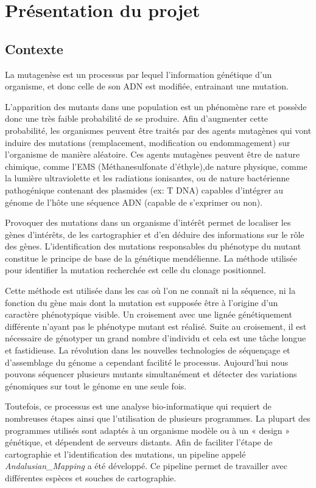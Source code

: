 \documentclass[12pt]{article}
\begin{document}
\newpage

\section{Présentation du projet}
\subsection{Contexte}

La mutagenèse est un processus par lequel l'information génétique d'un organisme, et donc celle de son ADN est modifiée, entrainant une mutation.

L'apparition des mutants dans une population est un phénomène rare et possède donc une très faible probabilité de se produire. Afin d'augmenter cette probabilité, les organismes peuvent être traités par des agents mutagènes qui vont induire des mutations (remplacement, modification ou endommagement) sur l'organisme de manière aléatoire. Ces agents mutagènes peuvent être de nature chimique, comme l'EMS (Méthanesulfonate d'éthyle),de nature physique, comme la lumière ultraviolette et les radiations ionisantes, ou de nature bactérienne pathogénique contenant des plasmides (ex: T DNA) capables d’intégrer au génome de l'hôte une séquence ADN (capable de s'exprimer ou non). 

Provoquer des mutations dans un organisme d’intérêt permet de localiser les gènes d’intérêts, de les cartographier et d'en déduire des informations sur le rôle des gènes. L'identification des mutations responsables du phénotype du mutant constitue le principe de base de la génétique mendélienne. La méthode utilisée pour identifier la mutation recherchée est celle du clonage positionnel.

Cette méthode est utilisée dans les cas où l'on ne connaît ni la séquence, ni la fonction du gène mais dont la mutation est supposée être à l'origine d'un caractère phénotypique visible. Un croisement avec une lignée génétiquement différente n'ayant pas le phénotype mutant est réalisé. Suite au croisement, il est nécessaire de génotyper un grand nombre d'individu et cela est une tâche longue et fastidieuse. La révolution dans les nouvelles technologies de séquençage et d'assemblage du génome a cependant facilité le processus. Aujourd'hui nous pouvons séquencer plusieurs mutants simultanément et détecter des variations génomiques sur tout le génome en une seule fois.

Toutefois, ce processus est une analyse bio-informatique qui requiert de nombreuses étapes ainsi que l'utilisation de plusieurs programmes. La plupart des programmes utilisés sont adaptés à un organisme modèle ou à un « design » génétique, et dépendent de serveurs distants. Afin de faciliter l'étape de cartographie et l'identification des mutations, un pipeline appelé \textit{Andalusian\_Mapping} a été développé. Ce pipeline permet de travailler avec différentes espèces et souches de cartographie.
\end{document}
